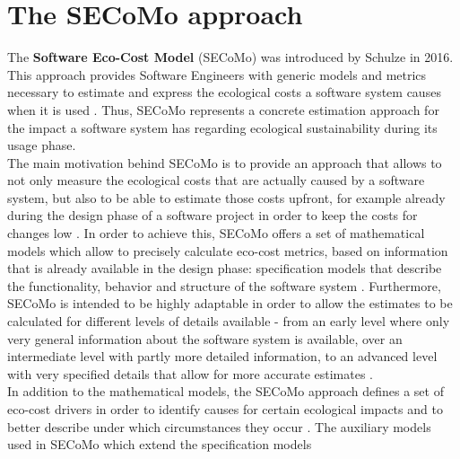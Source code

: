 \documentclass[oribibl]{llncs}
\begin{document}


\section{The SECoMo approach\label{secomo}} %
The \textbf{Software Eco-Cost Model} (SECoMo) was introduced by Schulze \cite{schulze_cost_2016} in 2016. This approach provides Software Engineers with generic models and metrics necessary to estimate and express the ecological costs a software system causes when it is used \cite{schulze_cost_2016}. Thus, SECoMo represents a concrete estimation approach for the impact a software system has regarding ecological sustainability during its usage phase.\\
The main motivation behind SECoMo is to provide an approach that allows to not only measure the ecological costs that are actually caused by a software system, but also to be able to estimate those costs upfront, for example already during the design phase of a software project in order to keep the costs for changes low \cite{schulze_cost_2016}. %
In order to achieve this, SECoMo offers a set of mathematical models which allow to precisely calculate eco-cost metrics, based on information that is already available in the design phase: specification models %
that describe the functionality, behavior and structure of the software system \cite{schulze_cost_2016}. Furthermore, SECoMo is intended to be highly adaptable in order to allow the estimates to be calculated for different levels of details available - from an early level where only very general information about the software system is available, over an intermediate level with partly more detailed information, to an advanced level with very specified details that allow for more accurate estimates \cite{schulze_cost_2016}.\\ %
In addition to the mathematical models, the SECoMo approach defines a set of eco-cost drivers in order to identify causes for certain ecological impacts and to better describe under which circumstances they occur \cite{schulze_cost_2016}. The auxiliary models used in SECoMo which extend the specification models %
\end{document}
